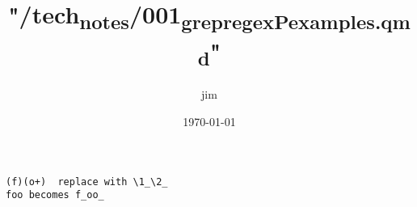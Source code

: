 \documentclass[11pt]{article}
\author{jim}
\date{\today}
\title{"/tech\textsubscript{notes}/001\textsubscript{grep}\textsubscript{regex}\textsubscript{P}\textsubscript{examples.qmd}"}
\begin{document}
\maketitle
\begin{verbatim}
(f)(o+)  replace with \1_\2_
foo becomes f_oo_
\end{verbatim}
\end{document}
